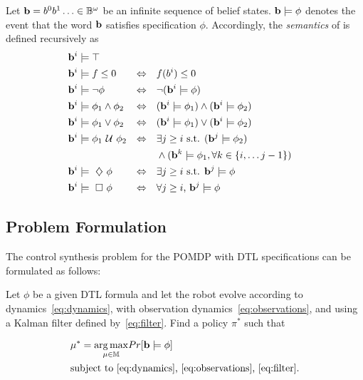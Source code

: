 \documentclass[conference]{IEEEtran}
\begin{document}
    \begin{definition}
    \label{def:gdtl-semantics}
    Let $\mathbf{b} = b^0b^1 \ldots \in \mathbb{B}^{\omega}$
    be an infinite sequence of belief states. $\mathbf{b} \models \phi$ denotes the event that the word $\mathbf{b}$ satisfies specification $\phi$. Accordingly, the {\em semantics} of \DTL is defined recursively as
    \begin{align*}
    &\BF{b}^i \models  \top  & \\
    &\BF{b}^i \models f \leq 0 & \Equiv\quad & f(b^i) \leq 0\\ %
    &\BF{b}^i \models \notltl \phi & \Equiv\quad & \notltl (\BF{b}^i \models \phi) \\
    &\BF{b}^i \models \phi_1 \andltl  \phi_2  & \Equiv\quad & ( \BF{b}^i \models \phi_1 ) \andltl ( \BF{b}^i \models \phi_2 ) \\
    &\BF{b}^i \models \phi_1 \orltl  \phi_2  & \Equiv\quad & ( \BF{b}^i \models \phi_1 ) \orltl ( \BF{b}^i \models \phi_2 ) \\
    &\BF{b}^i \models  \phi_1 \Until \phi_2 & \Equiv\quad & \exists j \geq i \text{ s.t. } ( \BF{b}^j \models \phi_2 ) \\
    & & & \andltl (\BF{b}^k \models \phi_1, \forall k \in \{i, \ldots j-1\})\\
    &\BF{b}^i \models \Event \phi  & \Equiv\quad & \exists j \geq i \text{ s.t. } \BF{b}^j \models \phi \\
    &\BF{b}^i \models \Always \phi  & \Equiv\quad & \forall j \geq i \text{, } \BF{b}^j \models \phi
    \end{align*}
    
    \end{definition}
    
    \subsection{Problem Formulation}\label{sec:prob}
    
    The control synthesis problem for the POMDP with DTL specifications can be formulated as follows:
    
    \begin{problem}
    \label{pb:mpp}
    Let $\phi$ be a given DTL formula and let the robot
    evolve according to dynamics~\eqref{eq:dynamics},
    with observation dynamics~\eqref{eq:observations},
    and using a Kalman filter defined by~\eqref{eq:filter}.
    Find a policy $\pi^*$ such that 
    
    \begin{equation}
    \label{eq:mpp}
    \begin{aligned}
    &\mu^* = \underset{\mu \in \BB{M}}{\arg \max}Pr[\BF{b} \models \phi] \\
    &\text{subject to~\eqref{eq:dynamics},~\eqref{eq:observations},~\eqref{eq:filter}.}
    \end{aligned}
    \end{equation}
    
    \end{problem}
    
\end{document}
